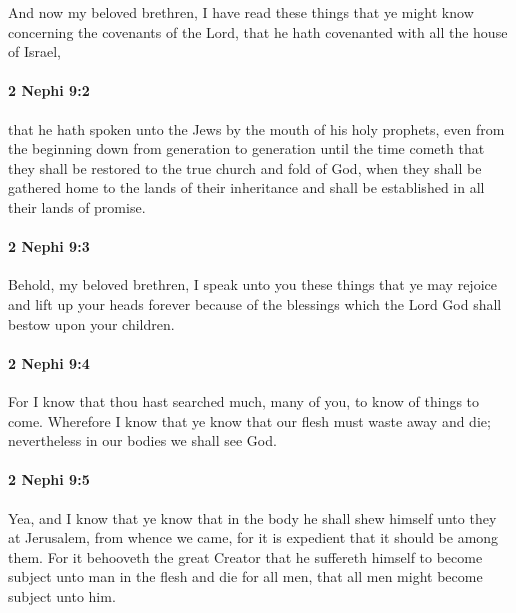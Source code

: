 			And now my beloved brethren,
			I have read these things that ye might know concerning the covenants of the Lord,
			that he hath covenanted with all the house of Israel,

		\paragraph{2 Nephi 9:2} %
			\label{2NEPHI-9-2}

			that he hath spoken unto the Jews by the mouth of his holy prophets,
			even from the beginning down from generation to generation
			until the time cometh that they shall be restored
			to the true church and fold of God,
			when they shall be gathered home to the lands of their inheritance
			and shall be established in all their lands of promise.

		\paragraph{2 Nephi 9:3} %
			\label{2NEPHI-9-3}

			Behold, my beloved brethren,
			I speak unto you these things
			that ye may rejoice and lift up your heads forever
			because of the blessings which the Lord God shall bestow upon your children.

		\paragraph{2 Nephi 9:4} %
			\label{2NEPHI-9-4}

			For I know that thou hast searched much, many of you,
			to know of things to come.
			Wherefore I know that ye know that our flesh must waste away and die;
			nevertheless in our bodies we shall see God.

		\paragraph{2 Nephi 9:5} %
			\label{2NEPHI-9-5}

			Yea, and I know that ye know that in the body he shall shew himself
			unto they at Jerusalem, from whence we came,
			for it is expedient that it should be among them.
			For it behooveth the great Creator that he suffereth himself
			to become subject unto man in the flesh and die for all men,
			that all men might become subject unto him.

